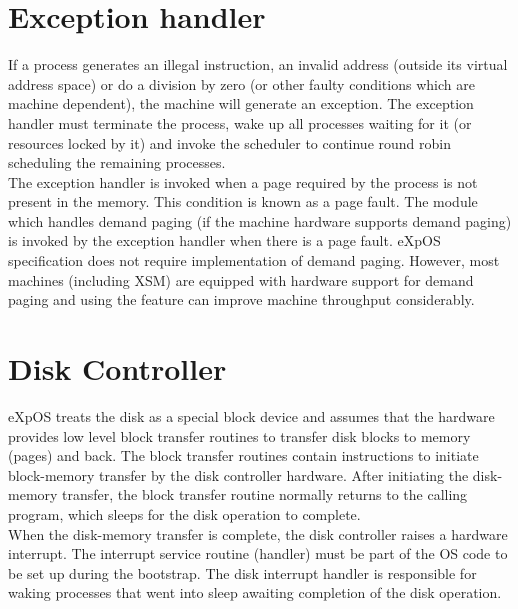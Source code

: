 \section{Exception handler}
If a process generates an illegal instruction, an invalid address (outside its virtual address space) or do a division by zero (or other faulty conditions which are machine dependent), the machine will generate an exception. The exception handler must terminate the process, wake up all processes waiting for it (or resources locked by it) and invoke the scheduler to continue round robin scheduling the remaining processes.
\\
The exception handler is invoked when a page required by the process is not present in the memory. This condition is known as a page fault. The module which handles demand paging (if the machine hardware supports demand paging) is invoked by the exception handler when there is a page fault. eXpOS specification does not require implementation of demand paging. However, most machines (including XSM) are equipped with hardware support for demand paging and using the feature can improve machine throughput considerably. 

\section{Disk Controller}
eXpOS treats the disk as a special block device and assumes that the hardware provides low level block transfer routines to transfer disk blocks to memory (pages) and back. The block transfer routines contain instructions to initiate block-memory transfer by the disk controller hardware. After initiating the disk-memory transfer, the block transfer routine normally returns to the calling program, which sleeps for the disk operation to complete.
\\
When the disk-memory transfer is complete, the disk controller raises a hardware interrupt. The interrupt service routine (handler) must be part of the OS code to be set up during the bootstrap. The disk interrupt handler is responsible for waking processes that went into sleep awaiting completion of the disk operation.

